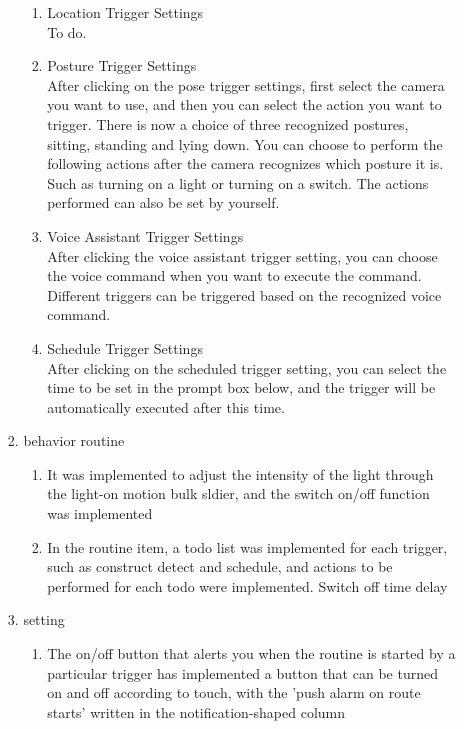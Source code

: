 \documentclass[11pt, conference]{IEEEtran}
\begin{document}
\begin{enumerate}[label=\arabic*.]
\begin{enumerate}[label=\arabic*]
\begin{enumerate}[label=\alph*]
            \begin{enumerate}
                \item  Location Trigger Settings\\
                    To do.\\
                \item  Posture Trigger Settings\\
                    After clicking on the pose trigger settings, first select the camera you want to use, and then you can select the action you want to trigger. There is now a choice of three recognized postures, sitting, standing and lying down. You can choose to perform the following actions after the camera recognizes which posture it is. Such as turning on a light or turning on a switch. The actions performed can also be set by yourself.\\
                \item  Voice Assistant Trigger Settings\\
                    After clicking the voice assistant trigger setting, you can choose the voice command when you want to execute the command. Different triggers can be triggered based on the recognized voice command.\\
                \item  Schedule Trigger Settings\\
                    After clicking on the scheduled trigger setting, you can select the time to be set in the prompt box below, and the trigger will be automatically executed after this time.\\
            \end{enumerate}
            
        \item behavior routine
        \begin{enumerate}
            \item It was implemented to adjust the intensity of the light through the light-on motion bulk sldier, and the switch on/off function was implemented\\
            

            \item In the routine item, a todo list was implemented for each trigger, such as construct detect and schedule, and actions to be performed for each todo were implemented. Switch off time delay
        \end{enumerate}
        \item setting
            \begin{enumerate}
            \item The on/off button that alerts you when the routine is started by a particular trigger has implemented a button that can be turned on and off according to touch, with the 'push alarm on route starts' written in the notification-shaped column\\


\end{enumerate}
\end{enumerate}
\end{enumerate}
\end{enumerate}
\end{document}
